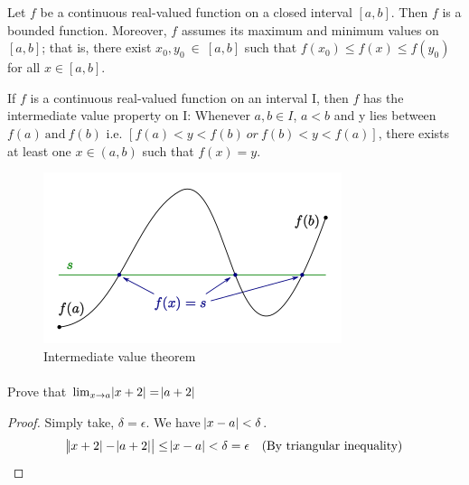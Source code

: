 \documentclass{notes}
\begin{document}
\begin{theorem}{}
	Let $f$ be a continuous real-valued function on a closed interval $[a, b]$.
	Then $f$ is a bounded function. Moreover, $f$ assumes its maximum
	and minimum values on $[a, b]$; that is, there exist $ x_0, y_0\ \in \ [a, b]$ such
	that $f(x_0) \leq f(x) \leq f(y_0)$ for all $x \in [a, b]$.
\end{theorem}

\begin{theorem}{}
	If $f$ is a continuous real-valued function on an interval I, then $f$ has
	the intermediate value property on I: Whenever $a, b \in I$, $a<b$ and y
	lies between $f(a)\ \text{and}\ f(b)$ i.e. $[f(a) < y <f(b)\ or\  f(b) <y<f(a)]$,
	there exists at least one $x \in (a, b)$ such that $f(x) = y$.
	
	
\end{theorem}
\begin{figure}[h!]  %
	\begin{center}
		\includegraphics[]{intermediate.png}
		\caption{Intermediate value theorem}
	\end{center}
\end{figure}
\paragraph{}
\begin{problem}
	Prove that $\lim_{x \to a} \abs{x+2} = \abs{a+2}$
\end{problem}
\begin{proof}
	Simply take, $ \delta = \epsilon$. We have $ \abs{x - a} < \delta$.
	$$ 
	\abs{\abs{x+2}-\abs{a+2}} \leq \abs{x - a}     < \delta  = \epsilon \quad \text{(By triangular inequality)}$$
\end{proof}
\end{document}
